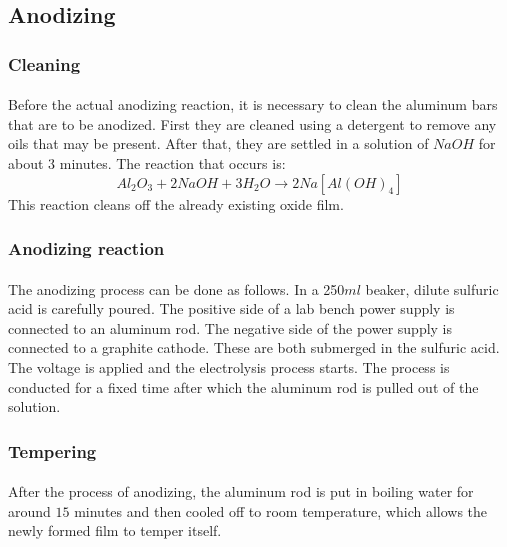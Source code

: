 \documentclass[a4paper]{article}
\begin{document}
\subsection{Anodizing} \label{sec:anodizing}

\subsubsection{Cleaning}

\paragraph*{}
Before the actual anodizing reaction, it is necessary to clean the aluminum
bars that are to be anodized. First they are cleaned using a detergent to
remove any oils that may be present. After that, they are settled in a solution
of $NaOH$ for about $3$ minutes. The reaction that occurs is:
$$Al_2O_3 + 2NaOH + 3H_2O \rightarrow 2Na[Al(OH)_4]$$
This reaction cleans off the already existing oxide film.

\subsubsection{Anodizing reaction}

\paragraph*{}
The anodizing process can be done as follows. In a  250$\si{ml}$ beaker, dilute
sulfuric acid is carefully poured. The positive side of a lab bench power
supply is connected to an aluminum rod. The negative side of the power supply
is connected to a graphite cathode. These are both submerged in the sulfuric
acid. The voltage is applied and the electrolysis process starts. The process
is conducted for a fixed time after which the aluminum rod is pulled out of the
solution.

\subsubsection{Tempering}

\paragraph*{}
After the process of anodizing, the aluminum rod is put in boiling water for
around $15$ minutes and then cooled off to room temperature, which allows the
newly formed film to temper itself.
\end{document}
